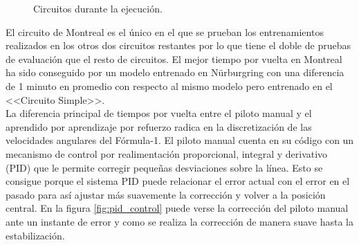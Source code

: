 \begin{figure}[ht!]
  \begin{center}
    \hspace{0.1cm}
    \hspace{0.1cm}
  \end{center}
  \centering
  \captionsetup{justification=centering,margin=2cm}
  \caption{Circuitos durante la ejecución.}
  \label{fig:circuitos-frame}
\end{figure}

El circuito de Montreal es el único en el que se prueban los entrenamientos realizados en los otros dos circuitos restantes por lo que tiene el doble de pruebas de evaluación que el resto de circuitos. El mejor tiempo por vuelta en Montreal ha sido conseguido por un modelo entrenado en Nürburgring con una diferencia de 1 minuto en promedio con respecto al mismo modelo pero entrenado en el <<Circuito Simple>>.\\

La diferencia principal de tiempos por vuelta entre el piloto manual y el aprendido por aprendizaje por refuerzo radica en la discretización de las velocidades angulares del Fórmula-1. El piloto manual cuenta en su código con un mecanismo de control por realimentación proporcional, integral y derivativo (PID) que le permite corregir pequeñas desviaciones sobre la línea. Esto se consigue porque el sistema PID puede relacionar el error actual con el error en el pasado para así ajustar más suavemente la corrección y volver a la posición central. En la figura \ref{fig:pid_control} puede verse la corrección del piloto manual ante un instante de error y como se realiza la corrección de manera suave hasta la estabilización.\\

